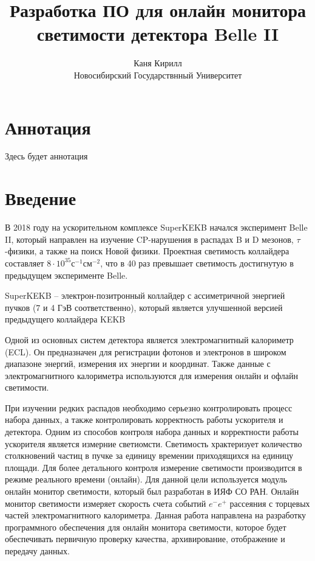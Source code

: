 \documentclass[a4paper, 12pt]{article}
\title{Разработка ПО для онлайн монитора светимости детектора Belle II}
\author{Каня Кирилл\\Новосибирский Государствнный Университет}
\begin{document}

\newpage

\section*{Аннотация}
Здесь будет аннотация
\newpage

\tableofcontents
\newpage

\section*{Введение}
  В 2018 году на ускорительном комплексе SuperKEKB начался эксперимент Belle II, который направлен на изучение CP-нарушения в распадах B и D мезонов, $\tau$-физики, а также на поиск Новой физики. Проектная светимость коллайдера составляет $8\cdot10^{35}$с$^{-1}$см$^{-2}$, что в 40 раз превышает светимость достигнутую в предыдущем эксперименте Belle.\par
  SuperKEKB -- электрон-позитронный коллайдер с ассиметричной энергией пучков (7 и 4 ГэВ соответственно), который является улучшенной версией предыдущего коллайдера KEKB\par
  Одной из основных систем детектора является электромагнитный калориметр (ECL). Он предназначен для регистрации фотонов и электронов в широком диапазоне энергий, измерения их энергии и координат. Также данные с электромагнитного калориметра используются для измерения онлайн и офлайн светимости.\par
  При изучении редких распадов необходимо серьезно контролировать процесс набора данных, а также контролировать корректность работы ускорителя и детектора. Одним из способов контроля набора данных и корректности работы ускорителя является измерние светиомсти. Светимость храктеризует количество столкновений частиц в пучке за единицу времении приходящихся на единицу площади. Для более детального контроля измерение светимости производится в режиме реального времени (онлайн). Для данной цели используется модуль онлайн монитор светимости, который был разработан в ИЯФ СО РАН. Онлайн монитор светимости измеряет скорость счета событий $e^-e^+$ рассеяния с торцевых частей электромагнитного калориметра. Данная работа направлена на разработку программного обеспечения для онлайн монитора светимости, которое будет обеспечивать первичную проверку качества, архивирование, отображение и передачу данных.\par
\end{document}
